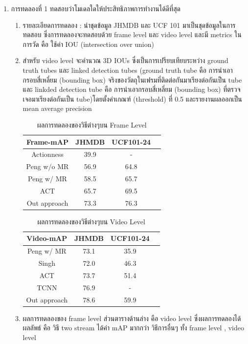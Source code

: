 \begin{enumerate}
	\item การทดลองที่ 1 ทดสอบว่าโมเดลใดให้ประสิทธิภาพการทำงานได้ดีที่สุด
	\begin{enumerate}
		\item รายละเอียดการทดลอง : นำชุดข้อมูล JHMDB และ UCF 101 มาเป็นชุดข้อมูลในการทดสอบ ซึ่งการทดลองจะทดสอบด้วย frame level และ video level และมี metrics ในการวัด คือ ใช้ค่า IOU (intersection over union)
		\item สำหรับ video level จะคำนวณ 3D IOUs ซึ่งเป็นการเปรียบเทียบระหว่าง ground truth tubes และ linked detection tubes (ground truth tube คือ การนำเอากรอบสี่เหลี่ยม (bounding box) จริงของวัตถุในเฟรมที่ติดต่อกันมาเรียงต่อกันเป็น tube และ linkded detection tube คือ การนำเอากรอบสี่เหลี่ยม (bounding box) ที่ตรวจเจอมาเรียงต่อกันเป็น tube)โดยตั้งค่าเกณฑ์ (threshold) ที่ 0.5 และรายงานผลออกเป็น mean average precision
	\begin{table}[!ht]
	\centering
	\begin{tabular}{|c|c|c|c|}
			\hline
			{Frame-mAP}&{JHMDB}&{UCF101-24}\\
			\hline
			Actionness 			& 39.9		& 	-						\\
			Peng w/o MR			& 56.9		& 64.8						\\
			Peng w/  MR 			& 58.5		& 65.7						\\
			ACT					& 65.7		& 69.5						\\
			\hline
			Out approach			& 73.3		& 76.3						\\
			\hline
		\end{tabular}
		\caption{ผลการทดลองของวิธีต่างๆบน Frame Level}
		\label{tab: transfer learning}
	\end{table}
	\begin{table}[!ht]
	\centering
	\begin{tabular}{|c|c|c|c|}
			\hline
			{Video-mAP}&{JHMDB}&{UCF101-24}\\
			\hline
			Peng w/ MR 			& 73.1		& 35.9						\\
			Singh				& 72.0		& 46.3						\\
			ACT			 		& 73.7		& 51.4						\\
			TCNN				& 76.9		& 	-						\\
			\hline
			Out approach			& 78.6		& 59.9						\\
			\hline
		\end{tabular}
		\caption{ผลการทดลองของวิธีต่างๆบน Video Level}
		\label{tab: transfer learning}
	\end{table}
		\item ผลการทดลองของ frame level ส่วนตารางด้านล่าง คือ video level ซึ่งผลการทดลองได้ผลลัพธ์ คือ วิธี two stream ได้ค่า mAP มากกว่า วิธีการอื่นๆ ทั้ง frame level , video level 

\end{enumerate}
\end{enumerate}
